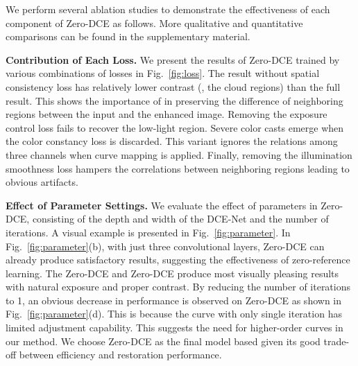\documentclass[10pt,twocolumn,letterpaper]{article}
\begin{document}
We perform several ablation studies to demonstrate the effectiveness of each component of Zero-DCE as follows.
More qualitative and quantitative comparisons can be found in the supplementary material.



\noindent
\textbf{Contribution of Each Loss.}
We present the results of Zero-DCE trained by various combinations of losses in Fig.~\ref{fig:loss}.
The result without spatial consistency loss  has relatively lower contrast (\eg, the cloud regions) than the full result. This shows the importance of  in preserving the difference of neighboring regions between the input and the enhanced image.
Removing the exposure control loss  fails to recover the low-light region.
Severe color casts emerge when the color constancy loss  is discarded. This variant ignores the relations among three channels when curve mapping is applied.
Finally, removing the illumination smoothness loss  hampers the correlations between neighboring regions leading to obvious artifacts.




\noindent
\textbf{Effect of Parameter Settings.} We evaluate the effect of parameters in Zero-DCE, consisting of the depth and width of the DCE-Net and the number of iterations.
A visual example is presented in Fig.~\ref{fig:parameter}.
In Fig.~\ref{fig:parameter}(b), with just three convolutional layers, Zero-DCE can already produce satisfactory results, suggesting the effectiveness of zero-reference learning.
The Zero-DCE and Zero-DCE produce most visually pleasing results with natural exposure and proper contrast.
By reducing the number of iterations to 1, an obvious decrease in performance is observed on Zero-DCE as shown in Fig.~\ref{fig:parameter}(d).
This is because the curve with only single iteration has limited adjustment capability. This suggests the need for higher-order curves in our method.
We choose Zero-DCE as the final model based given its good trade-off between efficiency and restoration performance.
\end{document}
